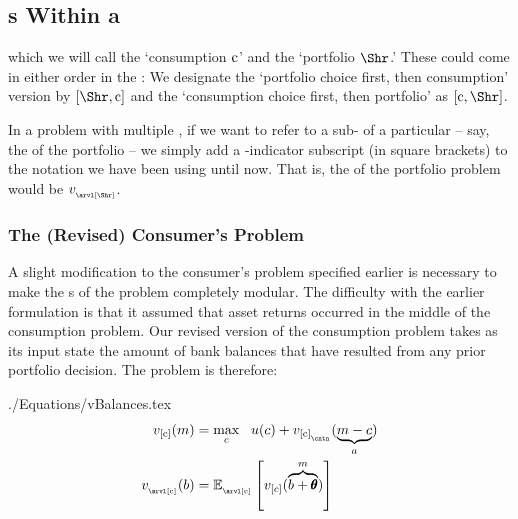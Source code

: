 \documentclass[\econtexRoot/SolvingMicroDSOPs]{subfiles}
\begin{document}
\hypertarget{stages-within-a-period}{}
\subsection{{\Stg}s Within a {\Interval}}\label{subsec:stageswithin}

which we will call the `consumption {\stg} $\mathrm{c}$' and the `portfolio {\stg} $\Shr$.'  These could come in either order in the {\interval}: We designate the `portfolio choice first, then consumption' version by $[\Shr,\cFunc]$ and the `consumption choice first, then portfolio' as $[\cFunc,\Shr]$.

In a problem with multiple {\stgs}, if we want to refer to a sub-{\move} of a particular {\stg} -- say, the {\Arrival} {\stg} of the portfolio {\stg} -- we simply add a {\stg}-indicator subscript (in square brackets) to the notation we have been using until now.  That is, the {\Arrival} {\stg} of the portfolio problem would be $\vFunc_{_\arvl[\Shr]}$.

\hypertarget{revised-consumers-problem}{}
\subsubsection{The (Revised) Consumer's Problem}\label{subsubsec:revised-consumers-problem}

A slight modification to the consumer's problem specified earlier is necessary to make the {\stg}s of the problem completely modular.  The difficulty with the earlier formulation is that it assumed that asset returns occurred in the middle {\move} of the consumption problem.  Our revised version of the consumption problem takes as its input state the amount of bank balances that have resulted from any prior portfolio decision.  The problem is therefore:
\begin{verbatimwrite}{./Equations/vBalances.tex}
  \begin{equation}\begin{gathered}\begin{aligned}
 \vFunc_{[\cFunc]}(\mNrm) & =  \max_{\cNrm} ~~ \uFunc(\cNrm)+  \vFunc_{[\cFunc]_{_\cntn}}(\underbrace{\mNrm-\cNrm}_{\aNrm})             
\\    \vFunc_{_\arvl[\cFunc]}(\bNrm) & = \Ex_{_\arvl[\cFunc]}\left[\vFunc_{[\cNrm]}(\overbrace{\bNrm+\TranShkEmp}^{m})\right] \label{eq:vBalances}
      \end{aligned}\end{gathered}\end{equation}
\end{verbatimwrite}
\unskip
\end{document}
